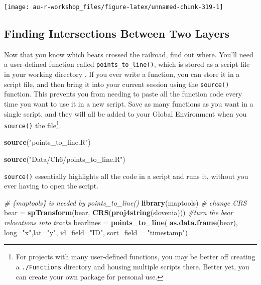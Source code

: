 \documentclass[]{book}
\newenvironment{Shaded}{\begin{snugshade}}{\end{snugshade}}
\newcommand{\KeywordTok}[1]{\textcolor[rgb]{0.13,0.29,0.53}{\textbf{#1}}}
\newcommand{\DataTypeTok}[1]{\textcolor[rgb]{0.13,0.29,0.53}{#1}}
\newcommand{\StringTok}[1]{\textcolor[rgb]{0.31,0.60,0.02}{#1}}
\newcommand{\CommentTok}[1]{\textcolor[rgb]{0.56,0.35,0.01}{\textit{#1}}}
\newcommand{\NormalTok}[1]{#1}
\let\rmarkdownfootnote\footnote%
\def\footnote{\protect\rmarkdownfootnote}
\theoremstyle{definition}
\theoremstyle{definition}
\theoremstyle{definition}
\theoremstyle{remark}
\begin{document}
\begin{center}\texttt{[image: au-r-workshop\_files/figure-latex/unnamed-chunk-319-1]} \end{center}

\subsection{Finding Intersections Between Two
Layers}\label{finding-intersections-between-two-layers}

Now that you know which bears crossed the railroad, find out where.
You'll need a user-defined function called \texttt{points\_to\_line()},
which is stored as a script file in your working directory
\citep{points-line-cite}. If you ever write a function, you can store it
in a script file, and then bring it into your current session using the
\texttt{source()} function. This prevents you from needing to paste all
the function code every time you want to use it in a new script. Save as
many functions as you want in a single script, and they will all be
added to your Global Environment when you \texttt{source()} the
file\footnote{For projects with many user-defined functions, you may be
  better off creating a \texttt{./Functions} directory and housing
  multiple scripts there. Better yet, you can create your own package
  for personal use.}.

\begin{Shaded}
\begin{Highlighting}[]
\KeywordTok{source}\NormalTok{(}\StringTok{"points_to_line.R"}\NormalTok{)}
\end{Highlighting}
\end{Shaded}

\begin{Shaded}
\begin{Highlighting}[]
\KeywordTok{source}\NormalTok{(}\StringTok{"Data/Ch6/points_to_line.R"}\NormalTok{)}
\end{Highlighting}
\end{Shaded}

\texttt{source()} essentially highlights all the code in a script and
runs it, without you ever having to open the script.

\begin{Shaded}
\begin{Highlighting}[]
\CommentTok{# \{maptools\} is needed by points_to_line()}
\KeywordTok{library}\NormalTok{(maptools) }
\CommentTok{# change CRS}
\NormalTok{bear =}\StringTok{ }\KeywordTok{spTransform}\NormalTok{(bear, }\KeywordTok{CRS}\NormalTok{(}\KeywordTok{proj4string}\NormalTok{(slovenia)))}
\CommentTok{#turn the bear relocations into tracks}
\NormalTok{bearlines =}\StringTok{ }\KeywordTok{points_to_line}\NormalTok{(}
  \KeywordTok{as.data.frame}\NormalTok{(bear),}
  \DataTypeTok{long=}\StringTok{"x"}\NormalTok{,}\DataTypeTok{lat=}\StringTok{"y"}\NormalTok{,}
  \DataTypeTok{id_field=}\StringTok{"ID"}\NormalTok{, }\DataTypeTok{sort_field =} \StringTok{"timestamp"}\NormalTok{)}
\end{Highlighting}
\end{Shaded}
\end{document}
